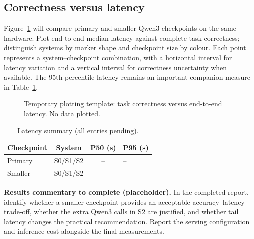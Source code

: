 \documentclass[10pt,conference]{IEEEtran}
\renewcommand{\arraystretch}{1.10}
\begin{document}
\subsection{Correctness versus latency}
Figure~\ref{fig:tradeoff} will compare primary and smaller Qwen3 checkpoints on the same hardware. Plot end-to-end median latency against complete-task correctness; distinguish systems by marker shape and checkpoint size by colour. Each point represents a system--checkpoint combination, with a horizontal interval for latency variation and a vertical interval for correctness uncertainty when available. The 95th-percentile latency remains an important companion measure in Table~\ref{tab:latency}.
\begin{figure}[!tbp]
\centering
{}
\caption{Temporary plotting template: task correctness versus end-to-end latency. No data plotted.}
\label{fig:tradeoff}
\end{figure}
\begin{table}[!tbp]
\caption{Latency summary (all entries pending).}
\label{tab:latency}
\centering\small
\renewcommand{\arraystretch}{1.32}
\begin{tabularx}{\columnwidth}{@{}lcc>{\centering\arraybackslash}X@{}}
\toprule
\textbf{Checkpoint} & \textbf{System} & \textbf{P50 (s)} & \textbf{P95 (s)}\\
\midrule
Primary & S0/S1/S2 & -- & --\\
Smaller & S0/S1/S2 & -- & --\\
\bottomrule
\end{tabularx}
\end{table}
\noindent\textbf{Results commentary to complete (placeholder).}  In the completed report, identify whether a smaller checkpoint provides an acceptable accuracy--latency trade-off, whether the extra Qwen3 calls in S2 are justified, and whether tail latency changes the practical recommendation. Report the serving configuration and inference cost alongside the final measurements.
\end{document}
